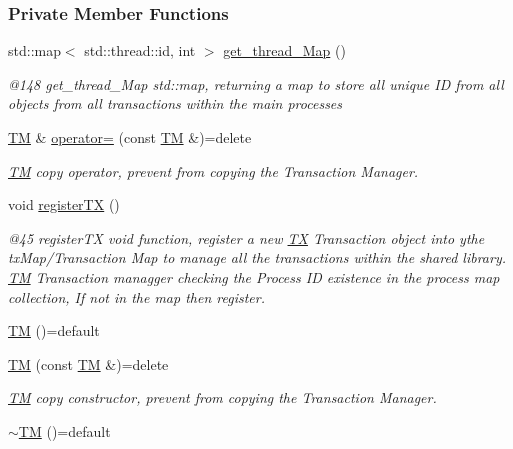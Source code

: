 \subsubsection*{Private Member Functions}
\begin{DoxyCompactItemize}
\item 
std\+::map$<$ std\+::thread\+::id, int $>$ \hyperlink{class_t_m_afb8bc9f42fe06c52747beb7f4c46915c_afb8bc9f42fe06c52747beb7f4c46915c}{get\+\_\+thread\+\_\+\+Map} ()
\begin{DoxyCompactList}\small\item\em @148 get\+\_\+thread\+\_\+\+Map std\+::map, returning a map to store all unique ID from all objects from all transactions within the main processes \end{DoxyCompactList}\item 
\hyperlink{class_t_m}{TM} \& \hyperlink{class_t_m_a85a6b783f0566f0877bab6a7de977c0a_a85a6b783f0566f0877bab6a7de977c0a}{operator=} (const \hyperlink{class_t_m}{TM} \&)=delete
\begin{DoxyCompactList}\small\item\em \hyperlink{class_t_m}{TM} copy operator, prevent from copying the Transaction Manager. \end{DoxyCompactList}\item 
void \hyperlink{class_t_m_a26ea481c24d9aa3aebd6dafb7253376e_a26ea481c24d9aa3aebd6dafb7253376e}{register\+TX} ()
\begin{DoxyCompactList}\small\item\em @45 register\+TX void function, register a new \hyperlink{class_t_x}{TX} Transaction object into ythe tx\+Map/\+Transaction Map to manage all the transactions within the shared library. \hyperlink{class_t_m}{TM} Transaction managger checking the Process ID existence in the process map collection, If not in the map then register. \end{DoxyCompactList}\item 
\hyperlink{class_t_m_a9b5afb6b9d7c5925ab5cc5c65078ac23_a9b5afb6b9d7c5925ab5cc5c65078ac23}{TM} ()=default
\item 
\hyperlink{class_t_m_a2d1de4a19f7ed6b2805ed6e955b8e45b_a2d1de4a19f7ed6b2805ed6e955b8e45b}{TM} (const \hyperlink{class_t_m}{TM} \&)=delete
\begin{DoxyCompactList}\small\item\em \hyperlink{class_t_m}{TM} copy constructor, prevent from copying the Transaction Manager. \end{DoxyCompactList}\item 
\hyperlink{class_t_m_a985f8cb24f685925ddd637c7030cd2b3_a985f8cb24f685925ddd637c7030cd2b3}{$\sim$\+TM} ()=default
\end{DoxyCompactItemize}
